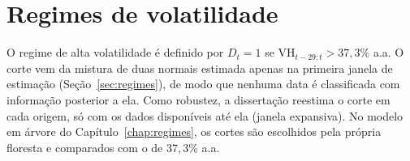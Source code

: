 \section{Regimes de volatilidade}
\label{sec:regimes_metodo}

O regime de alta volatilidade é definido por $D_t = 1$ se
$\text{VH}_{t-29:t} > 37{,}3\%$ a.a. O corte vem da mistura de duas normais
estimada apenas na primeira janela de estimação (Seção~\ref{sec:regimes}), de
modo que nenhuma data é classificada com informação posterior a ela. Como
robustez, a dissertação reestima o corte em cada origem, só com os dados
disponíveis até ela (janela expansiva). No modelo em árvore do
Capítulo~\ref{chap:regimes}, os cortes são escolhidos pela própria floresta e
comparados com o de $37{,}3\%$ a.a.
